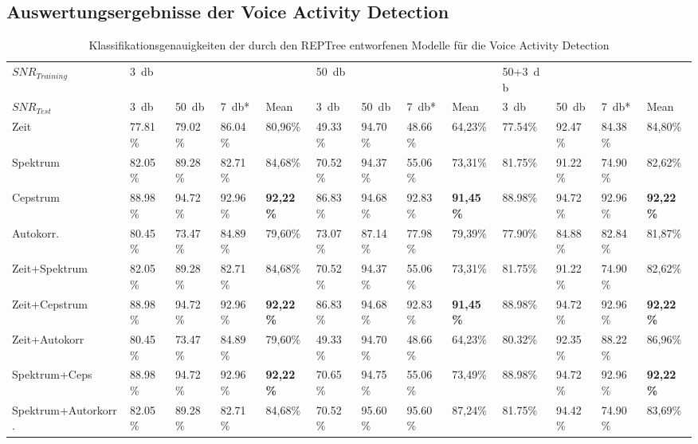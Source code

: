 
\begin{appendices}
\begin{landscape}
\chapter{Auswertungsergebnisse der Voice Activity Detection}
\pagestyle{plain}
\begin{table}[h]
\centering
\caption{Klassifikationsgenauigkeiten der durch den REPTree entworfenen Modelle für die Voice Activity Detection}
\label{tab:reptree_results}
\begin{tabular}{@{}lllllllllllll@{}}
\toprule
$SNR_{Training}$ & \SI{3}{\decibel}     &         &         &                  & \SI{50}{\decibel}    &         &         &                  & 50+\SI{3}{\decibel} &        &         &                  \\ 
$SNR_{Test}$     & \SI{3}{\decibel}     & \SI{50}{\decibel}    & \SI{7}{\decibel}*    & Mean             & \SI{3}{\decibel}     & \SI{50}{\decibel}    & \SI{7}{\decibel}*    & Mean             & \SI{3}{\decibel}     & \SI{50}{\decibel}    & \SI{7}{\decibel}*    & Mean             \\ \midrule
Zeit           & 77.81\% & 79.02\% & 86.04\% & 80,96\%          & 49.33\% & 94.70\% & 48.66\% & 64,23\%          & 77.54\% & 92.47\% & 84.38\% & 84,80\%          \\
Spektrum           & 82.05\% & 89.28\% & 82.71\% & 84,68\%          & 70.52\% & 94.37\% & 55.06\% & 73,31\%          & 81.75\% & 91.22\% & 74.90\% & 82,62\%          \\
Cepstrum           & 88.98\% & 94.72\% & 92.96\% & \textbf{92,22\%} & 86.83\% & 94.68\% & 92.83\% & \textbf{91,45\%} & 88.98\% & 94.72\% & 92.96\% & \textbf{92,22\%} \\
Autokorr.           & 80.45\% & 73.47\% & 84.89\% & 79,60\%          & 73.07\% & 87.14\% & 77.98\% & 79,39\%          & 77.90\% & 84.88\% & 82.84\% & 81,87\%          \\
Zeit+Spektrum      & 82.05\% & 89.28\% & 82.71\% & 84,68\%          & 70.52\% & 94.37\% & 55.06\% & 73,31\%          & 81.75\% & 91.22\% & 74.90\% & 82,62\%          \\
Zeit+Cepstrum      & 88.98\% & 94.72\% & 92.96\% & \textbf{92,22\%} & 86.83\% & 94.68\% & 92.83\% & \textbf{91,45\%} & 88.98\% & 94.72\% & 92.96\% & \textbf{92,22\%} \\
Zeit+Autokorr      & 80.45\% & 73.47\% & 84.89\% & 79,60\%          & 49.33\% & 94.70\% & 48.66\% & 64,23\%          & 80.32\% & 92.35\% & 88.22\% & 86,96\%          \\
Spektrum+Ceps      & 88.98\% & 94.72\% & 92.96\% & \textbf{92,22\%} & 70.65\% & 94.75\% & 55.06\% & 73,49\%          & 88.98\% & 94.72\% & 92.96\% & \textbf{92,22\%} \\
Spektrum+Autorkorr.      & 82.05\% & 89.28\% & 82.71\% & 84,68\%          & 70.52\% & 95.60\% & 95.60\% & 87,24\%          & 81.75\% & 94.42\% & 74.90\% & 83,69\%          \\ \bottomrule
\end{tabular}
\end{table}


\end{landscape}
\end{appendices}

